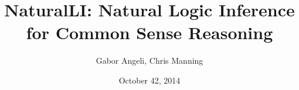\documentclass[hyperref]{beamer}
\title{NaturalLI: Natural Logic Inference for Common Sense Reasoning}
\subtitle{}
\author{Gabor Angeli, Chris Manning}
\date{October 42, 2014}
\institute[Stanford]{Stanford University}
\begin{document}
\begin{frame}
  \titlepage
\end{frame}

%
%
%
\end{document}
